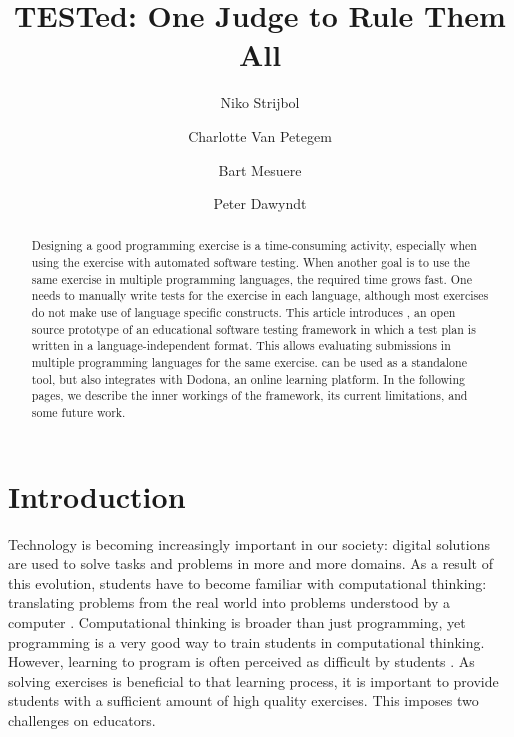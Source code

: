 \documentclass[5p,number]{elsarticle}
\title{TESTed: One Judge to Rule Them All}
\author{Niko Strijbol\fnref{fn2}}
\author{Charlotte Van Petegem\fnref{fn2}}
\author{Bart Mesuere\fnref{fn2}}
\author{Peter Dawyndt\fnref{fn2}}
\begin{document}
    \setmainfont[Ligatures=TeX,Numbers=OldStyle,Contextuals=Alternate]{Libertinus Serif}
    \setsansfont[Ligatures=TeX,Numbers=OldStyle,Contextuals=Alternate]{Libertinus Sans}
    \setmonofont[Scale=MatchLowercase,Contextuals={Alternate}]{Jetbrains Mono}

    \begin{abstract}
        Designing a good programming exercise is a time-consuming activity, especially when using the exercise with automated software testing.
        When another goal is to use the same exercise in multiple programming languages, the required time grows fast.
        One needs to manually write tests for the exercise in each language, although most exercises do not make use of language specific constructs.
        This article introduces \tested{}, an open source prototype of an educational software testing framework in which a test plan is written in a language-independent format.
        This allows evaluating submissions in multiple programming languages for the same exercise.
        \tested{} can be used as a standalone tool, but also integrates with Dodona, an online learning platform.
        In the following pages, we describe the inner workings of the framework, its current limitations, and some future work.
    \end{abstract}

    \maketitle

    \section{Introduction}\label{sec:introduction}

    \noindent
    Technology is becoming increasingly important in our society: digital solutions are used to solve tasks and problems in more and more domains.
    As a result of this evolution, students have to become familiar with computational thinking: translating problems from the real world into problems understood by a computer \cite{bastiaensen2017}.
    Computational thinking is broader than just programming, yet programming is a very good way to train students in computational thinking.
    However, learning to program is often perceived as difficult by students \cite{10.1145/3293881.3295779}.
    As solving exercises is beneficial to that learning process, it is important to provide students with a sufficient amount of high quality exercises.
    This imposes two challenges on educators.
    
\end{document}
